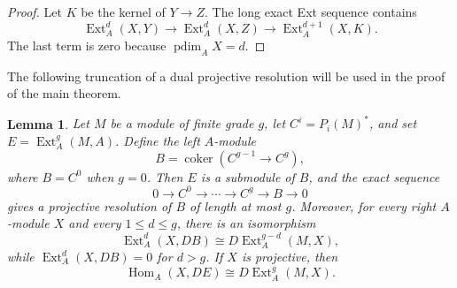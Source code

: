 \documentclass[a4paper]{amsart}
\newtheorem{lemma}[theorem]{Lemma}
\theoremstyle{definition}
\theoremstyle{remark}
\numberwithin{equation}{section}
\newcommand{\Ext}{\operatorname{Ext}}
\newcommand{\pdim}{\operatorname{pdim}}
\newcommand{\Hom}{\operatorname{Hom}}
\begin{document}
\begin{proof}
Let $K$ be the kernel of $Y\to Z$. The long exact Ext sequence contains
\[
 \Ext_A^d(X,Y)\longrightarrow\Ext_A^d(X,Z)
 \longrightarrow\Ext_A^{d+1}(X,K).
\]
The last term is zero because $\pdim_A X=d$.
\end{proof}

The following truncation of a dual projective resolution will be used in the proof of the main theorem.

\begin{lemma}\label{lem:dual-truncation}
Let $M$ be a module of finite grade $g$, let $C^i=P_i(M)^*$, and set $E=\Ext_A^g(M,A)$. Define the left $A$-module
\[
 B=\operatorname{coker}(C^{g-1}\longrightarrow C^g),
\]
where $B=C^0$ when $g=0$. Then $E$ is a submodule of $B$, and the exact sequence
\[
 0\longrightarrow C^0\longrightarrow\cdots\longrightarrow C^g
 \longrightarrow B\longrightarrow 0
\]
gives a projective resolution of $B$ of length at most $g$. Moreover, for every right $A$-module $X$ and every $1\leq d\leq g$, there is an isomorphism
\[
 \Ext_A^d(X,DB)\cong D\Ext_A^{g-d}(M,X),
\]
while $\Ext_A^d(X,DB)=0$ for $d>g$. If $X$ is projective, then
\[
 \Hom_A(X,DE)\cong D\Ext_A^g(M,X).
\]
\end{lemma}
\end{document}
